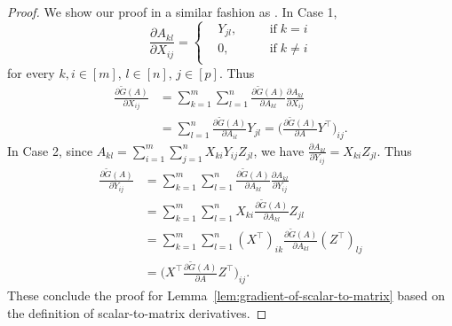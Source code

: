 \documentclass{article}
\theoremstyle{plain}
\begin{document}
\begin{proof}
	We show our proof in a similar fashion as \cite[Lemma 2]{hong2020generalized}. 
	In Case 1, 
	\begin{equation}
		\frac{\partial A_{kl}}{\partial X_{ij}} = \left\{
		\begin{aligned}
			& Y_{jl}, \quad&& \mathrm{if}\; k = i \\
			& 0, \quad && \mathrm{if }\; k \neq i \\
		\end{aligned}
		\right.
		\nonumber
	\end{equation}
	for every $k, i \in [m]$, $l \in [n]$, $j \in [p]$. 
	Thus
	\begin{equation}
		\begin{aligned}
			\frac{\partial \tilde{G}(A)}{\partial X_{ij}} & = \sum_{k=1}^m \sum_{l=1}^n \frac{\partial \tilde{G}(A)}{\partial A_{kl}} \frac{\partial A_{kl}}{\partial X_{ij}} \\
			& = \sum_{l=1}^n \frac{\partial \tilde{G}(A)}{\partial A_{il}} Y_{jl} = \Big(\frac{\partial \tilde{G}(A)}{\partial A} Y^\top \Big)_{ij}.
		\end{aligned}
		\nonumber
	\end{equation}
	In Case 2, since $\displaystyle A_{kl} = \sum_{i=1}^m \sum_{j=1}^n X_{ki} Y_{ij} Z_{jl}$, we have $\displaystyle \frac{\partial A_{kl}}{\partial Y_{ij}} = X_{ki} Z_{jl}$. Thus
	\begin{equation}
		\begin{aligned}
			\frac{\partial \tilde{G}(A)}{\partial Y_{ij}} & =\sum_{k=1}^m \sum_{l=1}^n \frac{\partial \tilde{G}(A)}{\partial A_{kl}} \frac{\partial A_{kl}}{\partial Y_{ij}} \\
			& = \sum_{k=1}^m \sum_{l=1}^n X_{ki} \frac{\partial \tilde{G}(A)}{\partial A_{kl}} Z_{jl} \\
			& =\sum_{k=1}^m \sum_{l=1}^n (X^\top)_{ik} \frac{\partial \tilde{G}(A)}{\partial A_{kl}} (Z^\top)_{lj} \\
			& = \Big(X^\top \frac{\partial \tilde{G}(A)}{\partial A} Z^\top \Big)_{ij}.
		\end{aligned}
		\nonumber
	\end{equation}
	These conclude the proof for Lemma~\ref{lem:gradient-of-scalar-to-matrix} based on the definition of scalar-to-matrix derivatives.
\end{proof}
\end{document}
